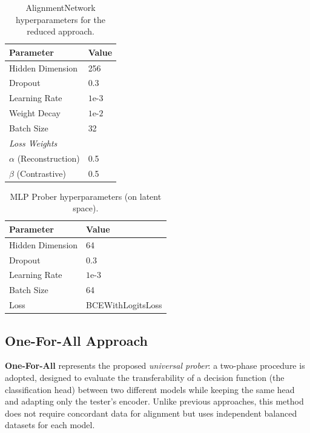 \begin{table}[H]
\centering
\begin{tabularx}{\textwidth}{Xl}
    \toprule
    \textbf{Parameter} & \textbf{Value} \\
    \midrule
    Hidden Dimension & 256 \\
    Dropout & 0.3 \\
    Learning Rate & $1\text{e-}3$ \\
    Weight Decay & $1\text{e-}2$ \\
    Batch Size & 32 \\
    \midrule
    \textit{Loss Weights} & \\
    $\alpha$ (Reconstruction) & 0.5 \\
    $\beta$ (Contrastive) & 0.5 \\
    \bottomrule
\end{tabularx}
\caption{AlignmentNetwork hyperparameters for the reduced approach.}
\label{tab:hyperparams-alignment-clean-reduced}
\end{table}


\begin{table}[H]
\centering
\begin{tabularx}{\textwidth}{Xl}
    \toprule
    \textbf{Parameter} & \textbf{Value} \\
    \midrule
    Hidden Dimension & 64 \\
    Dropout & 0.3 \\
    Learning Rate & $1\text{e-}3$ \\
    Batch Size & 64 \\
    Loss & BCEWithLogitsLoss \\
    \bottomrule
\end{tabularx}
\caption{MLP Prober hyperparameters (on latent space).}
\label{tab:hyperparams-prober-clean-reduced}
\end{table}

\subsection{One-For-All Approach}

\textbf{One-For-All} represents the proposed \textit{universal prober}: a two-phase procedure is adopted, designed to evaluate the transferability of a decision function (the classification head) between two different models while keeping the same head and adapting only the tester's encoder. Unlike previous approaches, this method does not require concordant data for alignment but uses independent balanced datasets for each model.

